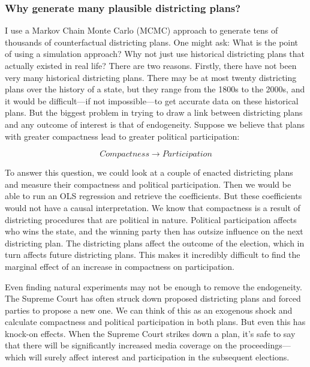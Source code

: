 \documentclass[]{article}
\begin{document}
\hypertarget{why-generate-many-plausible-districting-plans}{%
\subsubsection{Why generate many plausible districting
plans?}\label{why-generate-many-plausible-districting-plans}}

I use a Markov Chain Monte Carlo (MCMC) approach to generate tens of
thousands of counterfactual districting plans. One might ask: What is
the point of using a simulation approach? Why not just use historical
districting plans that actually existed in real life? There are two
reasons. Firstly, there have not been very many historical districting
plans. There may be at most twenty districting plans over the history of
a state, but they range from the 1800s to the 2000s, and it would be
difficult---if not impossible---to get accurate data on these historical
plans. But the biggest problem in trying to draw a link between
districting plans and any outcome of interest is that of endogeneity.
Suppose we believe that plans with greater compactness lead to greater
political participation:

\[Compactness \rightarrow Participation\]

To answer this question, we could look at a couple of enacted
districting plans and measure their compactness and political
participation. Then we would be able to run an OLS regression and
retrieve the coefficients. But these coefficients would not have a
causal interpretation. We know that compactness is a result of
districting procedures that are political in nature. Political
participation affects who wins the state, and the winning party then has
outsize influence on the next districting plan. The districting plans
affect the outcome of the election, which in turn affects future
districting plans. This makes it incredibly difficult to find the
marginal effect of an increase in compactness on participation.

Even finding natural experiments may not be enough to remove the
endogeneity. The Supreme Court has often struck down proposed
districting plans and forced parties to propose a new one. We can think
of this as an exogenous shock and calculate compactness and political
participation in both plans. But even this has knock-on effects. When
the Supreme Court strikes down a plan, it's safe to say that there will
be significantly increased media coverage on the proceedings---which
will surely affect interest and participation in the subsequent
elections.
\end{document}
